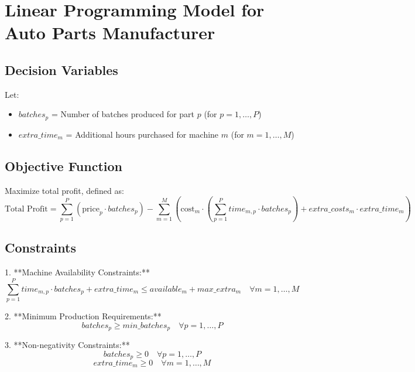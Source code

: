 \documentclass{article}
\begin{document}
\section*{Linear Programming Model for Auto Parts Manufacturer}

\subsection*{Decision Variables}
Let:
\begin{itemize}
    \item \(batches_p\) = Number of batches produced for part \(p\) (for \(p = 1, \ldots, P\))
    \item \(extra\_time_m\) = Additional hours purchased for machine \(m\) (for \(m = 1, \ldots, M\))
\end{itemize}

\subsection*{Objective Function}
Maximize total profit, defined as:
\[
\text{Total Profit} = \sum_{p=1}^{P} \left( \text{price}_p \cdot batches_p \right) - \sum_{m=1}^{M} \left( \text{cost}_m \cdot \left( \sum_{p=1}^{P} time_{m,p} \cdot batches_p \right) + extra\_costs_m \cdot extra\_time_m \right)
\]

\subsection*{Constraints}
1. **Machine Availability Constraints:**
   \[
   \sum_{p=1}^{P} time_{m,p} \cdot batches_p + extra\_time_m \leq available_m + max\_extra_m \quad \forall m = 1, \ldots, M
   \]

2. **Minimum Production Requirements:**
   \[
   batches_p \geq min\_batches_p \quad \forall p = 1, \ldots, P
   \]

3. **Non-negativity Constraints:**
   \[
   batches_p \geq 0 \quad \forall p = 1, \ldots, P
   \]
   \[
   extra\_time_m \geq 0 \quad \forall m = 1, \ldots, M
   \]
\end{document}
